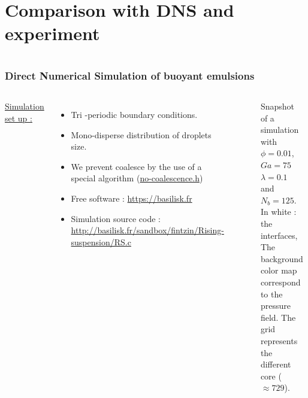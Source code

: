 \documentclass{sintefbeamer}
\begin{document}
\section{Comparison with DNS and experiment}

\section*{}
\begin{frame}
\frametitle{Direct Numerical Simulation of buoyant emulsions}
\begin{columns}
\underline{Simulation set up :} 
\begin{itemize}
  \item Tri -periodic boundary conditions. 
  \item Mono-disperse distribution of droplets size.
  \item We prevent coalesce by the use of a special algorithm 
  (\href{http://basilisk.fr/sandbox/fintzin/Rising-Suspension/no-coalescence.h}{no-coalescence.h})
  \item Free software : \url{https://basilisk.fr}
  \item Simulation source code : \url{http://basilisk.fr/sandbox/fintzin/Rising-suspension/RS.c}
\end{itemize}

\begin{figure}
  \caption{Snapshot of a simulation with $\phi = 0.01$, $Ga = 75$ $\lambda = 0.1$ and $N_b = 125$. In white : the interfaces, The background color map correspond to the pressure field. The grid represents the different core ($\approx 729$).
  }
\end{figure}
\centering
\href{file:///work/fintzin/BUBLLES_PROJECT/movies/cut.gif}{}
\includegraphics[width =  1.1\textwidth]{image/PHI_01_Ga_75.png}
\end{columns}
\end{frame}
\end{document}
